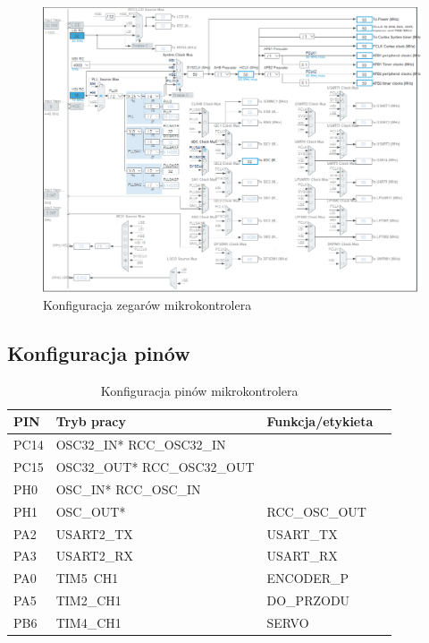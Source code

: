 \documentclass[10pt, a4paper]{article}
\begin{document}
\newpage
\begin{figure}[H]
	\centering
	\includegraphics[width=0.9\textheight,angle=90]{figures/zegar.png}
	\caption{Konfiguracja zegarów mikrokontrolera}
	\label{fig:KonfiguracjaZegara}
\end{figure}

\subsection{Konfiguracja pinów}

\begin{table}[H]
	\centering
	\begin{tabular}{|l|l|l|l|}
		\hline
		PIN & Tryb pracy & Funkcja/etykieta\\
		\hline
		PC14 & OSC32\_IN*	RCC\_OSC32\_IN	&\\
		PC15 & OSC32\_OUT*	RCC\_OSC32\_OUT	&\\
		PH0&  OSC\_IN*	RCC\_OSC\_IN	&\\
		PH1&  OSC\_OUT*&		RCC\_OSC\_OUT	\\
		PA2&	USART2\_TX&	USART\_TX\\
		PA3&	USART2\_RX&	USART\_RX\\
		PA0& TIM5\ CH1& ENCODER\_P \\
		PA5&	TIM2\_CH1&	DO\_PRZODU\\
		PB6&    TIM4\_CH1&	SERVO\\
		
		
		\hline
	\end{tabular}
	\caption{Konfiguracja pinów mikrokontrolera}
\end{table}
\end{document}

